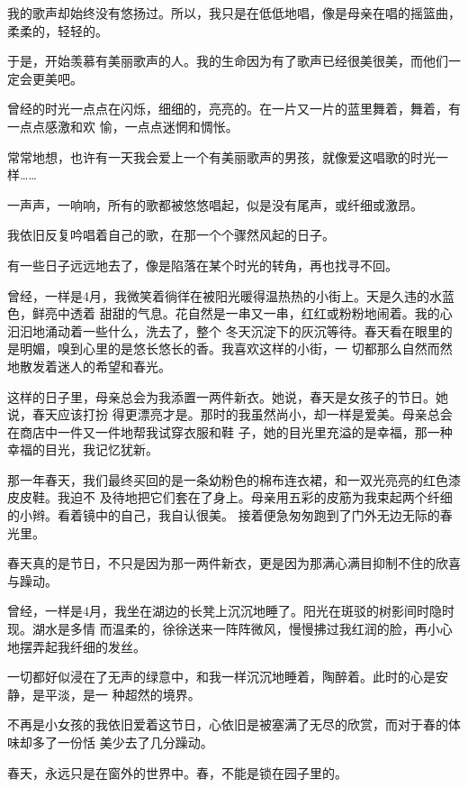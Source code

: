 		我的歌声却始终没有悠扬过。所以，我只是在低低地唱，像是母亲在唱的摇篮曲，柔柔的，轻轻的。

		于是，开始羡慕有美丽歌声的人。我的生命因为有了歌声已经很美很美，而他们一定会更美吧。

		曾经的时光一点点在闪烁，细细的，亮亮的。在一片又一片的蓝里舞着，舞着，有一点点感激和欢
	愉，一点点迷惘和惆怅。

		常常地想，也许有一天我会爱上一个有美丽歌声的男孩，就像爱这唱歌的时光一样……

		一声声，一响响，所有的歌都被悠悠唱起，似是没有尾声，或纤细或激昂。

		我依旧反复吟唱着自己的歌，在那一个个骤然风起的日子。

	\endwriting



		有一些日子远远地去了，像是陷落在某个时光的转角，再也找寻不回。

		\vspace{1em}
		曾经，一样是4月，我微笑着徜徉在被阳光暖得温热热的小街上。天是久违的水蓝色，鲜亮中透着
	甜甜的气息。花自然是一串又一串，红红或粉粉地闹着。我的心汩汩地涌动着一些什么，洗去了，整个
	冬天沉淀下的灰沉等待。春天看在眼里的是明媚，嗅到心里的是悠长悠长的香。我喜欢这样的小街，一
	切都那么自然而然地散发着迷人的希望和春光。

		这样的日子里，母亲总会为我添置一两件新衣。她说，春天是女孩子的节日。她说，春天应该打扮
	得更漂亮才是。那时的我虽然尚小，却一样是爱美。母亲总会在商店中一件又一件地帮我试穿衣服和鞋
	子，她的目光里充溢的是幸福，那一种幸福的目光，我记忆犹新。

		那一年春天，我们最终买回的是一条幼粉色的棉布连衣裙，和一双光亮亮的红色漆皮皮鞋。我迫不
	及待地把它们套在了身上。母亲用五彩的皮筋为我束起两个纤细的小辫。看着镜中的自己，我自认很美。
	接着便急匆匆跑到了门外无边无际的春光里。

		春天真的是节日，不只是因为那一两件新衣，更是因为那满心满目抑制不住的欣喜与躁动。

		曾经，一样是4月，我坐在湖边的长凳上沉沉地睡了。阳光在斑驳的树影间时隐时现。湖水是多情
	而温柔的，徐徐送来一阵阵微风，慢慢拂过我红润的脸，再小心地摆弄起我纤细的发丝。

		一切都好似浸在了无声的绿意中，和我一样沉沉地睡着，陶醉着。此时的心是安静，是平淡，是一
	种超然的境界。

		不再是小女孩的我依旧爱着这节日，心依旧是被塞满了无尽的欣赏，而对于春的体味却多了一份恬
	美少去了几分躁动。

		春天，永远只是在窗外的世界中。春，不能是锁在园子里的。


